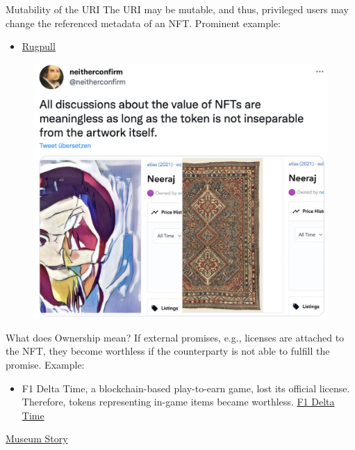 \documentclass[handout]{beamer}
\begin{document}
\begin{frame}{Mutability of the URI}
		The URI may be mutable, and thus, privileged users may change the referenced metadata of an NFT. Prominent example: 
		\begin{itemize}
			\item \href{https://twitter.com/neitherconfirm/status/1369285946198396928}{\link Rugpull} 
		\end{itemize}
		\begin{figure}
				\centering
				\includegraphics[scale=0.25]{../assets/images/rugpull.png}
				\caption*{}	
			\end{figure}	
\end{frame}

\begin{frame}{What does Ownership mean?}
If external promises, e.g., licenses are attached to the NFT, they become worthless if the counterparty is not able to fulfill the promise. Example:
		\begin{itemize}
			\item  F1 Delta Time, a blockchain-based play-to-earn game, lost its official license. Therefore, tokens representing in-game items became worthless. \href{https://www.pcgamer.com/f1-delta-time-one-of-the-first-major-nft-games-has-shut-down/}{\link F1 Delta Time}
		\end{itemize}
	\href{https://www.theartnewspaper.com/2022/01/21/a-german-museum-has-accidentally-lost-access-to-two-highly-valuable-nfts}{\link Museum Story}
\end{frame}
\end{document}
